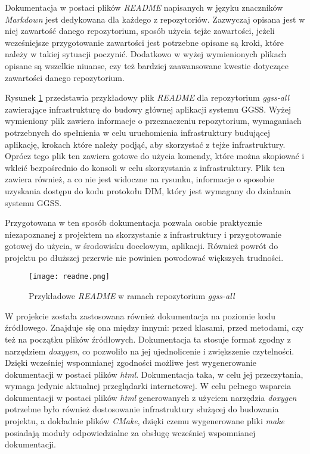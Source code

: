 Dokumentacja w postaci plików \emph{README} napisanych w języku znaczników \emph{Markdown} jest dedykowana dla każdego z repozytoriów. Zazwyczaj opisana jest w niej zawartość danego repozytorium, sposób użycia tejże zawartości, jeżeli wcześniejsze przygotowanie zawartości jest potrzebne opisane są kroki, które należy w takiej sytuacji poczynić. Dodatkowo w wyżej wymienionych plikach opisane są wszelkie niuanse, czy też bardziej zaawansowane kwestie dotyczące zawartości danego repozytorium.

Rysunek \ref{fig:readme} przedstawia przykładowy plik \emph{README} dla repozytorium \emph{ggss-all} zawierające infrastrukturę do budowy głównej aplikacji systemu GGSS. Wyżej wymieniony plik zawiera informacje o przeznaczeniu repozytorium, wymaganiach potrzebnych do spełnienia w celu uruchomienia infrastruktury budującej aplikację, krokach które należy podjąć, aby skorzystać z tejże infrastruktury. Oprócz tego plik ten zawiera gotowe do użycia komendy, które można skopiować i wkleić bezpośrednio do konsoli w celu skorzystania z infrastruktury. Plik ten zawiera również, a co nie jest widoczne na rysunku, informacje o sposobie uzyskania dostępu do kodu protokołu DIM, który jest wymagany do działania systemu GGSS.


Przygotowana w ten sposób dokumentacja pozwala osobie praktycznie niezapoznanej z projektem na skorzystanie z infrastruktury i przygotowanie gotowej do użycia, w środowisku docelowym, aplikacji. Również powrót do projektu po dłuższej przerwie nie powinien powodować większych trudności.
\newpage
\begin{figure}[H]
    \centering
    \texttt{[image: readme.png]}
    \caption{Przykładowe \emph{README} w ramach repozytorium \emph{ggss-all}}
    \label{fig:readme}
\end{figure} %

W projekcie została zastosowana również dokumentacja na poziomie kodu źródłowego. Znajduje się ona między innymi: przed klasami, przed metodami, czy też na początku plików źródłowych. Dokumentacja ta stosuje format zgodny z narzędziem \emph{doxygen}, co pozwoliło na jej ujednolicenie i zwiększenie czytelności. Dzięki wcześniej wspomnianej zgodności możliwe jest wygenerowanie dokumentacji w postaci plików \emph{html}. Dokumentacja taka, w celu jej przeczytania, wymaga jedynie aktualnej przeglądarki internetowej. W celu pełnego wsparcia dokumentacji w postaci plików \emph{html} generowanych z użyciem narzędzia \emph{doxygen} potrzebne było również dostosowanie infrastruktury służącej do budowania projektu, a dokładnie plików \emph{CMake}, dzięki czemu wygenerowane pliki \emph{make} posiadają moduły odpowiedzialne za obsługę wcześniej wspomnianej dokumentacji.

